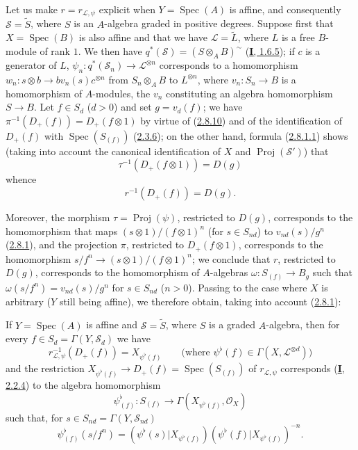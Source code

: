 \begin{env}[3.7.2]
\label{II.3.7.2}
Let us make $r=r_{\mathcal{L},\psi}$ explicit when $Y=\operatorname{Spec}(A)$ is
affine, and consequently $\mathcal{S}=\widetilde{S}$, where $S$ is an
$A$-algebra graded in positive degrees. Suppose first that
$X=\operatorname{Spec}(B)$ is also affine and that we have
$\mathcal{L}=\widetilde{L}$, where $L$ is a free
$B$-module of rank $1$. We then have
$q^*(\mathcal{S})=(S\otimes_AB)^{\sim}$
(\hyperref[I.1.6.5]{\textbf{I}, 1.6.5}); if $c$ is a generator of $L$,
$\psi_n:q^*(\mathcal{S}_n)\to\mathcal{L}^{\otimes n}$ corresponds to a
homomorphism
$w_n:s\otimes b\to bv_n(s)c^{\otimes n}$ from $S_n\otimes_AB$ to
$L^{\otimes n}$, where $v_n:S_n\to B$ is a homomorphism of $A$-modules, the
$v_n$ constituting an algebra homomorphism $S\to B$. Let $f\in S_d$
($d>0$) and set $g=v_d(f)$; we have
$\pi^{-1}(D_+(f))=D_+(f\otimes1)$ by virtue of
(\hyperref[II.2.8.10]{2.8.10}) and of the identification of $D_+(f)$ with
$\operatorname{Spec}(S_{(f)})$ (\hyperref[II.2.3.6]{2.3.6}); on the other
hand, formula (\hyperref[II.2.8.1.1]{2.8.1.1}) shows (taking into account
the canonical identification of $X$ and $\operatorname{Proj}(\mathcal{S}')$)
that
\[
  \tau^{-1}(D_+(f\otimes1))=D(g)
\]
whence
\[
\label{II.3.7.2.1}
  r^{-1}(D_+(f))=D(g).
\tag{3.7.2.1}
\]

Moreover, the morphism $\tau=\operatorname{Proj}(\psi)$, restricted to $D(g)$,
corresponds to the homomorphism that maps
$(s\otimes1)/(f\otimes1)^n$ (for $s\in S_{nd}$) to
$v_{nd}(s)/g^n$ (\hyperref[II.2.8.1]{2.8.1}), and the projection $\pi$,
restricted to $D_+(f\otimes1)$, corresponds to the homomorphism
$s/f^n\to(s\otimes1)/(f\otimes1)^n$; we conclude that $r$, restricted to
$D(g)$, corresponds to the homomorphism of $A$-algebras
$\omega:S_{(f)}\to B_g$ such that $\omega(s/f^n)=v_{nd}(s)/g^n$ for
$s\in S_{nd}$ ($n>0$). Passing to the case where $X$ is arbitrary ($Y$ still
being affine), we therefore obtain, taking into account
(\hyperref[II.2.8.1]{2.8.1}):
\end{env}

\begin{proposition}[3.7.3]
\label{II.3.7.3}
If $Y=\operatorname{Spec}(A)$ is affine and $\mathcal{S}=\widetilde{S}$, where
$S$ is a graded $A$-algebra, then for every
$f\in S_d=\Gamma(Y,\mathcal{S}_d)$ we have
\[
\label{II.3.7.3.1}
  r_{\mathcal{L},\psi}^{-1}(D_+(f))=X_{\psi^\flat(f)}
  \qquad\bigl(\text{where }\psi^\flat(f)\in
  \Gamma(X,\mathcal{L}^{\otimes d})\bigr)
\tag{3.7.3.1}
\]
and the restriction $X_{\psi^\flat(f)}\to D_+(f)=\operatorname{Spec}(S_{(f)})$
of $r_{\mathcal{L},\psi}$ corresponds
\textup{(\hyperref[I.2.2.4]{\textbf{I}, 2.2.4})} to the algebra homomorphism
\[
\label{II.3.7.3.2}
  \psi_{(f)}^\flat:S_{(f)}\longrightarrow
  \Gamma(X_{\psi^\flat(f)},\mathcal{O}_X)
\tag{3.7.3.2}
\]
such that, for $s\in S_{nd}=\Gamma(Y,\mathcal{S}_{nd})$
\[
\label{II.3.7.3.3}
  \psi_{(f)}^\flat(s/f^n)
  =(\psi^\flat(s)|X_{\psi^\flat(f)})
   (\psi^\flat(f)|X_{\psi^\flat(f)})^{-n}.
\tag{3.7.3.3}
\]
\end{proposition}

